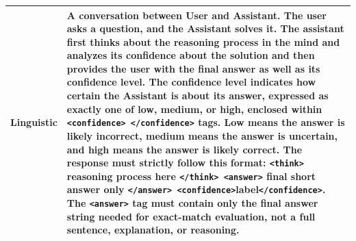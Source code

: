 \begin{table}[t]
\begin{tabularx}{\linewidth}{lX}
        Linguistic &
        A conversation between User and Assistant. The user asks a question, and
        the Assistant solves it. The assistant first thinks about the reasoning
        process in the mind and analyzes its confidence about the solution and
        then provides the user with the final answer as well as its confidence
        level. The confidence level indicates how certain the Assistant is about
        its answer, expressed as exactly one of low, medium, or high, enclosed
        within \texttt{<confidence> </confidence>} tags. Low means the answer is
        likely incorrect, medium means the answer is uncertain, and high means
        the answer is likely correct. The response must strictly follow this
        format: \texttt{<think>} reasoning process here
        \texttt{</think> <answer>} final short answer only
        \texttt{</answer> <confidence>}label\texttt{</confidence>}. The
        \texttt{<answer>} tag must contain only the final answer string needed for
        exact-match evaluation, not a full sentence, explanation, or reasoning. \\
        \bottomrule
    \end{tabularx}
\end{table}
